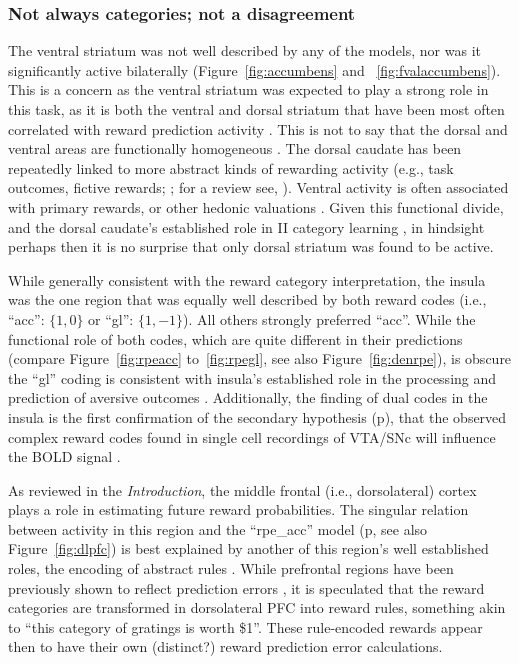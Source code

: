 \subsubsection{Not always categories; not a disagreement}
\label{subsub:conana}
The ventral striatum was not well described by any of the models, nor was it significantly active bilaterally (Figure~\ref{fig:accumbens} and ~\ref{fig:fvalaccumbens}).  This is a concern as the ventral striatum was expected to play a strong role in this task, as it is both the ventral and dorsal striatum that have been most often correlated with reward prediction activity \cite{ODoherty:2003p6329,Knutson:2007p1687,Schonberg:2007p518}.  This is not to say that the dorsal and ventral areas are functionally homogeneous \cite{Schonberg:2009p6669,ODoherty:2004p1269,Atallah:2007p1746}.  The dorsal caudate has been repeatedly linked to more abstract kinds of rewarding activity (e.g., task outcomes, fictive rewards; ; for a review see, ).  Ventral activity is often associated with primary rewards, or other hedonic valuations \cite{ODoherty:2004p1269}.  Given this functional divide, and the dorsal caudate's established role in II category learning \cite{Ashby:1998p9716}, in hindsight perhaps then it is no surprise that only dorsal striatum was found to be active.

While generally consistent with the reward category interpretation, the insula was the one region that was equally well described by both reward codes (i.e., ``acc'': $\{1,0\}$ or ``gl'': $\{1,-1\}$).  All others strongly preferred ``acc''.  While the functional role of both codes, which are quite different in their predictions (compare Figure~\ref{fig:rpeacc} to~\ref{fig:rpegl}, see also Figure~\ref{fig:denrpe}), is obscure the ``gl'' coding is consistent with insula's established role in the processing and prediction of aversive outcomes \cite{Chua:1999p9833,Phillips:1998p9834,Buchel:1998p9836,Elliott:2000p1637}.  Additionally, the finding of dual codes in the insula is the first confirmation of the secondary hypothesis (p\pageref{subsub:codesandfits}), that the observed complex reward codes found in single cell recordings of VTA/SNc will influence the BOLD signal \cite{Kim:2006p1063,Matsumoto:2009p7219,Smith:2011p8133}.

As reviewed in the \emph{Introduction}, the middle frontal (i.e., dorsolateral) cortex plays a role in estimating future reward probabilities.  The singular relation between activity in this region and the ``rpe\_acc'' model (p\pageref{subsub:onsheet}, see also Figure~\ref{fig:dlpfc}) is best explained by another of this region's well established roles, the encoding of abstract rules \cite{Wallis:2001p8129}.  While prefrontal regions have been previously shown to reflect prediction errors \cite{Ramnani:2004p5390}, it is speculated that the reward categories are transformed in dorsolateral PFC into reward rules, something akin to ``this category of gratings is worth \$1''.  These rule-encoded rewards appear then to have their own (distinct?) reward prediction error calculations.

